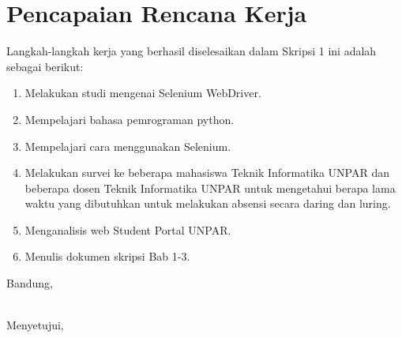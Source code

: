 \documentclass[a4paper,twoside]{article}
\begin{document}
\section{Pencapaian Rencana Kerja}
Langkah-langkah kerja yang berhasil diselesaikan dalam Skripsi 1 ini adalah sebagai berikut:
\begin{enumerate}
\item Melakukan studi mengenai Selenium WebDriver. 
\item Mempelajari bahasa pemrograman python.
\item Mempelajari cara menggunakan Selenium.
\item Melakukan survei ke beberapa mahasiswa Teknik Informatika UNPAR dan beberapa dosen Teknik Informatika UNPAR untuk mengetahui berapa lama waktu yang dibutuhkan untuk melakukan absensi secara daring dan luring.
\item Menganalisis web Student Portal UNPAR.
\item Menulis dokumen skripsi Bab 1-3.
\end{enumerate}



\vspace{1cm}
\centering Bandung, \tanggal\\
\vspace{2cm} \nama \\ 
\vspace{1cm}

Menyetujui, \\
\end{document}

